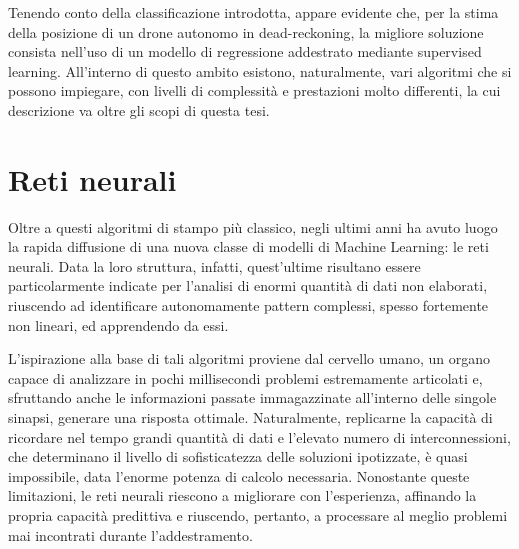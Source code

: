 Tenendo conto della classificazione introdotta, appare evidente che, per la stima della posizione di un drone autonomo in dead-reckoning, la migliore soluzione consista nell'uso di un modello di regressione addestrato mediante supervised learning. All'interno di questo ambito esistono, naturalmente, vari algoritmi che si possono impiegare, con livelli di complessità e prestazioni molto differenti, la cui descrizione va oltre gli scopi di questa tesi. 


\section{Reti neurali}

Oltre a questi algoritmi di stampo più classico, negli ultimi anni ha avuto luogo la rapida diffusione di una nuova classe di modelli di Machine Learning: le reti neurali\cite{NN_Introduction}. Data la loro struttura, infatti, quest'ultime risultano essere particolarmente indicate per l'analisi di enormi quantità di dati non elaborati, riuscendo ad identificare autonomamente pattern complessi, spesso fortemente non lineari, ed apprendendo da essi. 

L'ispirazione alla base di tali algoritmi proviene dal cervello umano, un organo capace di analizzare in pochi millisecondi problemi estremamente articolati e, sfruttando anche le informazioni passate immagazzinate all'interno delle singole sinapsi, generare una risposta ottimale. Naturalmente, replicarne la capacità di ricordare nel tempo grandi quantità di dati e l'elevato numero di interconnessioni, che determinano il livello di sofisticatezza delle soluzioni ipotizzate, è quasi impossibile, data l'enorme potenza di calcolo necessaria. Nonostante queste limitazioni, le reti neurali riescono a migliorare con l'esperienza, affinando la propria capacità predittiva e riuscendo, pertanto, a processare al meglio problemi mai incontrati durante l'addestramento.

